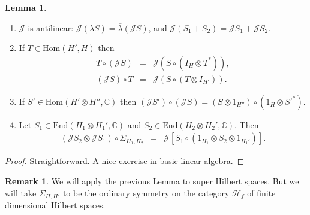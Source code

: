 \documentclass[11pt]{article}
\theoremstyle{definition}
\newtheorem{lemma}[thm]{Lemma}
\theoremstyle{definition}
\newtheorem{note}[thm]{Remark}
\theoremstyle{remark}
\def\2#1{{\mathcal #1}}
\def\7#1{{\mathbb #1}}
\newcommand{\Hom}{\mathrm{Hom}}
\newcommand{\End}{\mathrm{End}}
\begin{document}
\begin{lemma} \mbox{}
  \begin{enumerate}
  \item $\2J$ is antilinear: $\2J(\lambda S)=\overline{\lambda}(\2JS)$, and
    $\2J(S_1+S_2)=\2JS_1+\2JS_2$.
  \item \label{magic} If $T\in \Hom (H',H)$ then \begin{eqnarray*}
      T\circ (\2JS) &=& \2J(S\circ (I_{H}\otimes T^{*})) ,\\
      (\2JS)\circ T &=& \2J(S\circ (T\otimes I_{H'})) . \end{eqnarray*}
  \item If $S'\in \Hom (H'\otimes H'', \7C )$ then $(\2JS')\circ (\2JS)=(S\otimes
    1_{H''})\circ (1_{H}\otimes S'^*)$.
   \item Let $S_1\in \End (H_1\otimes H_1',\7C )$ and $S_2\in \End (H_2\otimes
     H_2',\7C )$.  Then
   \begin{eqnarray*} (\2JS_2 \otimes \2JS_1)\circ \Sigma _{H_1,H_2} &=&\2J[S_1\circ
     (1_{H_1}\otimes S_2\otimes 1_{H_1'})] .
   \end{eqnarray*}
\end{enumerate} \label{trivial}
\end{lemma}

\begin{proof} Straightforward.  A nice exercise in basic linear
  algebra. \end{proof}

\begin{note} We will apply the previous Lemma to super Hilbert spaces.
  But we will take $\Sigma _{H,H'}$ to be the ordinary symmetry on the
  category $\2H _f$ of finite dimensional Hilbert spaces. \end{note}
\end{document}
